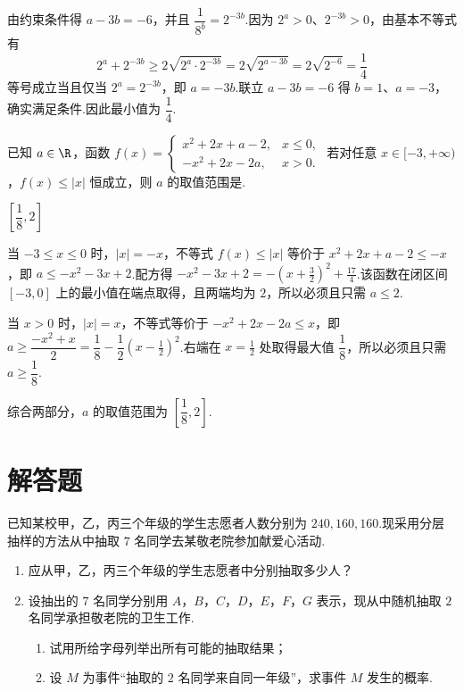 \begin{solution}
由约束条件得 \(a-3b=-6\)，并且 \(\dfrac1{8^b}=2^{-3b}\).因为 \(2^a>0\)、\(2^{-3b}>0\)，由基本不等式有
\[
2^a+2^{-3b}\ge2\sqrt{2^a\cdot2^{-3b}}=2\sqrt{2^{a-3b}}=2\sqrt{2^{-6}}=\frac14
\]
等号成立当且仅当 \(2^a=2^{-3b}\)，即 \(a=-3b\).联立 \(a-3b=-6\) 得 \(b=1\)、\(a=-3\)，确实满足条件.因此最小值为 \(\dfrac14\).
\end{solution}

\begin{problem}
已知 \(a\in\R\)，函数 \(f(x)=\begin{cases}
x^2+2x+a-2, & x\le0,\\
-x^2+2x-2a, & x>0.
\end{cases}\)
若对任意 \(x\in[-3,+\infty)\)，\(f(x)\le|x|\) 恒成立，则 \(a\) 的取值范围是\fillinblank{}.
\end{problem}

\begin{answer}
\(\left[\dfrac18,2\right]\)
\end{answer}

\begin{solution}
当 \(-3\le x\le0\) 时，\(|x|=-x\)，不等式 \(f(x)\le|x|\) 等价于
\(x^2+2x+a-2\le-x\)，即 \(a\le -x^2-3x+2\).配方得
\(-x^2-3x+2=-(x+\tfrac32)^2+\tfrac{17}{4}\).该函数在闭区间 \([-3,0]\) 上的最小值在端点取得，且两端均为 \(2\)，所以必须且只需 \(a\le2\).

当 \(x>0\) 时，\(|x|=x\)，不等式等价于
\(-x^2+2x-2a\le x\)，即 \(a\ge\dfrac{-x^2+x}{2}=\dfrac18-\dfrac12\left(x-\tfrac12\right)^2\).右端在 \(x=\tfrac12\) 处取得最大值 \(\dfrac18\)，所以必须且只需 \(a\ge\dfrac18\).

综合两部分，\(a\) 的取值范围为 \(\left[\dfrac18,2\right]\).
\end{solution}

\section{解答题}

\begin{problem}

已知某校甲，乙，丙三个年级的学生志愿者人数分别为 \(240,160,160\).现采用分层抽样的方法从中抽取 \(7\) 名同学去某敬老院参加献爱心活动.

\begin{enumerate}
\item 应从甲，乙，丙三个年级的学生志愿者中分别抽取多少人？
\item 设抽出的 \(7\) 名同学分别用 \(A\)，\(B\)，\(C\)，\(D\)，\(E\)，\(F\)，\(G\) 表示，现从中随机抽取 \(2\) 名同学承担敬老院的卫生工作.
\begin{enumerate}
\item 试用所给字母列举出所有可能的抽取结果；
\item 设 \(M\) 为事件“抽取的 \(2\) 名同学来自同一年级”，求事件 \(M\) 发生的概率.
\end{enumerate}
\end{enumerate}
\end{problem}

